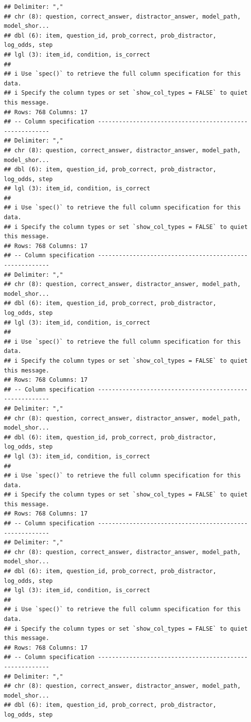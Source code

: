 \documentclass[
]{article}
\begin{document}
\begin{verbatim}
## Delimiter: ","
## chr (8): question, correct_answer, distractor_answer, model_path, model_shor...
## dbl (6): item, question_id, prob_correct, prob_distractor, log_odds, step
## lgl (3): item_id, condition, is_correct
## 
## i Use `spec()` to retrieve the full column specification for this data.
## i Specify the column types or set `show_col_types = FALSE` to quiet this message.
## Rows: 768 Columns: 17
## -- Column specification --------------------------------------------------------
## Delimiter: ","
## chr (8): question, correct_answer, distractor_answer, model_path, model_shor...
## dbl (6): item, question_id, prob_correct, prob_distractor, log_odds, step
## lgl (3): item_id, condition, is_correct
## 
## i Use `spec()` to retrieve the full column specification for this data.
## i Specify the column types or set `show_col_types = FALSE` to quiet this message.
## Rows: 768 Columns: 17
## -- Column specification --------------------------------------------------------
## Delimiter: ","
## chr (8): question, correct_answer, distractor_answer, model_path, model_shor...
## dbl (6): item, question_id, prob_correct, prob_distractor, log_odds, step
## lgl (3): item_id, condition, is_correct
## 
## i Use `spec()` to retrieve the full column specification for this data.
## i Specify the column types or set `show_col_types = FALSE` to quiet this message.
## Rows: 768 Columns: 17
## -- Column specification --------------------------------------------------------
## Delimiter: ","
## chr (8): question, correct_answer, distractor_answer, model_path, model_shor...
## dbl (6): item, question_id, prob_correct, prob_distractor, log_odds, step
## lgl (3): item_id, condition, is_correct
## 
## i Use `spec()` to retrieve the full column specification for this data.
## i Specify the column types or set `show_col_types = FALSE` to quiet this message.
## Rows: 768 Columns: 17
## -- Column specification --------------------------------------------------------
## Delimiter: ","
## chr (8): question, correct_answer, distractor_answer, model_path, model_shor...
## dbl (6): item, question_id, prob_correct, prob_distractor, log_odds, step
## lgl (3): item_id, condition, is_correct
## 
## i Use `spec()` to retrieve the full column specification for this data.
## i Specify the column types or set `show_col_types = FALSE` to quiet this message.
## Rows: 768 Columns: 17
## -- Column specification --------------------------------------------------------
## Delimiter: ","
## chr (8): question, correct_answer, distractor_answer, model_path, model_shor...
## dbl (6): item, question_id, prob_correct, prob_distractor, log_odds, step

\end{verbatim}
\end{document}
